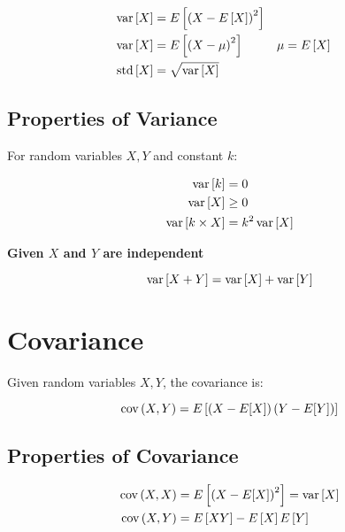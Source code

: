   \begin{align}
    \operatorname{var} \left[ X \right] &= E \left[ \left( X - E \left[ X \right] \right)^{2} \right] \\
    \operatorname{var} \left[ X \right] &= E \left[ \left( X - \mu \right)^{2} \right] & \mu &= E \left[ X \right] \\
    \label{eq: ch4-std-is-sqrt-var}
    \operatorname{std} \left[ X \right] &= \sqrt{ \operatorname{var} \left[ X \right] }
  \end{align}
  
  \subsection{Properties of Variance}
  
    For random variables $ X, Y $ and constant $ k $:
    
    \begin{align}
      \operatorname{var} \left[ k \right] &= 0 \\
      \operatorname{var} \left[ X \right] &\geq 0 \\
      \operatorname{var} \left[ k \times X \right] &= k^{2} \operatorname{var} \left[ X \right]
    \end{align}
    
    \textbf{Given $ X $ and $ Y $ are independent}
    
    \begin{equation}
      \operatorname{var} \left[ X + Y \right] = \operatorname{var} \left[ X \right] + \operatorname{var} \left[ Y \right]
    \end{equation}
    
\section{Covariance}

  Given random variables $ X, Y $, the covariance is:
  
  \begin{equation}
    \operatorname{cov} \left( X, Y \right) = E \left[ \left( X - E[X] \right) \left( Y - E[Y] \right) \right]
  \end{equation}
  
  \subsection{Properties of Covariance}
  
    \begin{align}
      \operatorname{cov} \left( X, X \right) &= E \left[ \left( X - E[X] \right)^{2} \right] = \operatorname{var} \left[ X \right] \\ 
      \operatorname{cov} \left( X, Y \right) &= E \left[ XY \right] - E \left[ X \right] E \left[ Y \right] \\ 
    \end{align}
    

